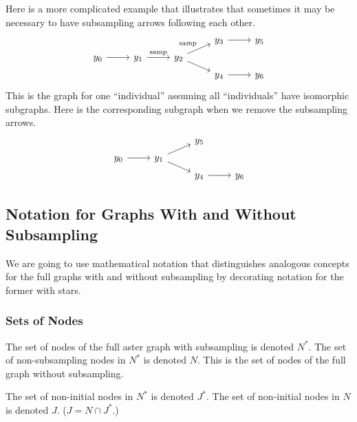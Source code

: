 Here is a more complicated example that illustrates that sometimes
it may be necessary to have subsampling arrows following each other.
\begin{equation} \label{graph:with-with}
\begin{tikzcd}[row sep=tiny]
   \hphantom{y_0} & \hphantom{y_1} & \hphantom{y_2} & y_3 \arrow{r} & y_5
   \\
   y_0 \arrow{r} & y_1 \arrow{r}{\text{samp}}
   & y_2 \arrow{ru}{\text{samp}} \arrow{rd}
   \\
   \hphantom{y_0} & \hphantom{y_1} & \hphantom{y_2} & y_4 \arrow{r} & y_6
\end{tikzcd}
\end{equation}
This is the graph for one ``individual'' assuming all ``individuals'' have
isomorphic subgraphs.
Here is the corresponding subgraph when we remove the subsampling arrows.
\begin{equation} \label{graph:with-with-stripped}
\begin{tikzcd}[row sep=tiny]
   \hphantom{y_0} & \hphantom{y_1} & y_5
   \\
   y_0 \arrow{r} & y_1 \arrow{ru} \arrow{rd}
   \\
   \hphantom{y_0} & \hphantom{y_1} & y_4 \arrow{r} & y_6
\end{tikzcd}
\end{equation}


\subsection{Notation for Graphs With and Without Subsampling}
\label{sec:with-and-without-notation}

We are going to use mathematical notation that distinguishes analogous
concepts for the full graphs with and without subsampling by decorating
notation for the former with stars.

\subsubsection{Sets of Nodes}

The set of nodes of the full aster graph with subsampling is denoted $N^*$.
The set of non-subsampling nodes in $N^*$ is denoted $N$.  This is the set
of nodes of the full graph without subsampling.

The set of non-initial nodes in $N^*$ is denoted $J^*$.
The set of non-initial nodes in $N$ is denoted $J$.
($J = N \cap J^*$.)

